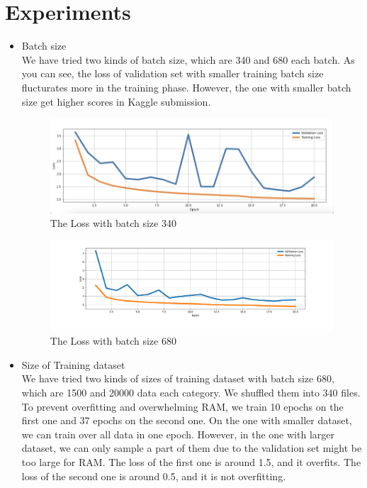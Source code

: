 \documentclass[10pt,twocolumn,letterpaper]{article}
\begin{document}
\section{Experiments}
\begin{itemize}
\item Batch size \\
We have tried two kinds of batch size, which are 340 and 680 each batch. 
As you can see, the loss of validation set with smaller training batch size flucturates more in the training phase. 
However, the one with smaller batch size get higher scores in Kaggle submission. 
\graphicspath{{./images}}
\begin{figure}[!htb]
    \centering
    \includegraphics[width=0.8\linewidth]{340-loss.png}
    \caption{The Loss with batch size 340}
\end{figure}
\begin{figure}[!htb]
    \centering
    \includegraphics[width=0.95\linewidth]{680-loss.png}
    \caption{The Loss with batch size 680}
\end{figure}
\item Size of Training dataset \\
We have tried two kinds of sizes of training dataset with batch size 680, 
which are 1500 and 20000 data each category. We shuffled them into 340 files.
To prevent overfitting and overwhelming RAM, we train 10 epochs on the first one and 37 epochs on the second one.
On the one with smaller dataset, we can train over all data in one epoch.
However, in the one with larger dataset, 
we can only sample a part of them due to the validation set might be too large for RAM. 
The loss of the first one is around 1.5, and it overfits.
The loss of the second one is around 0.5, and it is not overfitting.

\end{itemize}
\end{document}
